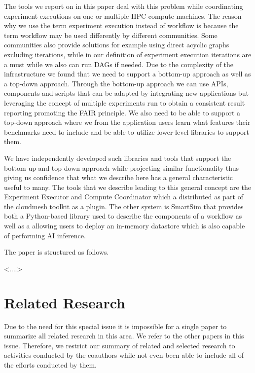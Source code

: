 \documentclass[utf8]{FrontiersinVancouver} %
\begin{document}
The tools we report on in this paper deal with this problem while coordinating experiment executions on one or multiple HPC compute machines.
The reason why we use the term experiment execution instead of workflow is because the term workflow may be used differently by different communities. Some communities also provide solutions for example using direct acyclic graphs excluding iterations, while in our definition of experiment execution iterations are a must while we also can run DAGs if needed. 
Due to the complexity of the infrastructure we found that we need to support a bottom-up approach as well as a top-down approach.
Through the bottom-up approach we can use APIs, components and scripts that can be adapted by integrating new applications but leveraging the concept of multiple experiments run to obtain a consistent result reporting promoting the FAIR principle.
We also need to be able to support a top-down approach where we from the application users learn what features their benchmarks need to include and be able to utilize lower-level libraries to support them.

We have independently developed such libraries and tools that support the bottom up and top down approach while projecting similar functionality thus giving us confidence that what we describe here has a general characteristic useful to many.
The tools that we describe leading to this general concept are the Experiment Executor and Compute Coordinator which a distributed as part of the cloudmesh toolkit as a plugin. The other system is SmartSim that provides both a Python-based library used to describe the components of a workflow as well as a allowing users to deploy an in-memory datastore which is also capable of performing AI inference. 

The paper is structured as follows.

<....> 


\section{Related Research}

Due to the need for this special issue it is impossible for a single paper to summarize all related research in this area. We refer to the other papers in this issue. Therefore, we restrict our summary of related and selected research to activities conducted by the coauthors while not even been able to include all of the efforts conducted by them.
\end{document}
